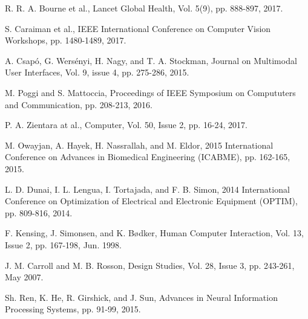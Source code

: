 \documentclass[10pt,conference,compsocconf]{IEEEtran}
\begin{document}
\begin{thebibliography}{99}

 R. R. A. Bourne et al.,  Lancet Global Health, Vol. 5(9), pp. 888-897, 2017.


 S. Caraiman et al.,  IEEE International Conference on Computer Vision Workshops, pp. 1480-1489, 2017.

 A. Csap\'{o}, G. Wers\'{e}nyi, H. Nagy, and T. A. Stockman,  Journal on Multimodal User Interfaces, Vol. 9, issue 4,  pp. 275-286, 2015.


 M. Poggi and S. Mattoccia,  Proceedings of IEEE Symposium on Compututers and Communication, pp. 208-213, 2016.

 P. A. Zientara at al.,  Computer, Vol. 50, Issue 2, pp. 16-24, 2017.


 M. Owayjan, A. Hayek, H. Nassrallah, and M. Eldor,  2015 International Conference on Advances in Biomedical Engineering (ICABME), pp. 162-165, 2015.


 L. D. Dunai, I. L. Lengua, I. Tortajada, and F. B. Simon,     2014 International Conference on Optimization of Electrical and Electronic Equipment (OPTIM),  pp. 809-816, 2014.

 F. Kensing, J. Simonsen, and K. B\o dker,  Human Computer Interaction, Vol. 13, Issue 2, pp. 167-198, Jun. 1998.


 J. M. Carroll and M. B. Rosson,  Design Studies, Vol. 28, Issue 3, pp. 243-261, May 2007.

 Sh. Ren, K. He, R. Girshick, and J. Sun,  Advances in Neural Information Processing Systems, pp. 91-99, 2015.





\end{thebibliography}
\end{document}

